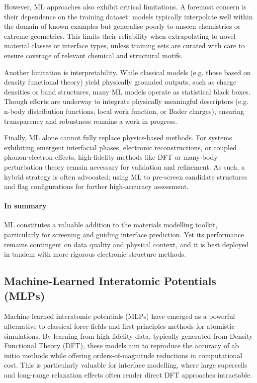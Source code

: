 However, ML approaches also exhibit critical limitations. A foremost concern is their dependence on the training dataset: models typically interpolate well within the domain of known examples but generalise poorly to unseen chemistries or extreme geometries. This limits their reliability when extrapolating to novel material classes or interface types, unless training sets are curated with care to ensure coverage of relevant chemical and structural motifs.

Another limitation is interpretability. While classical models (e.g. those based on density functional theory) yield physically grounded outputs, such as charge densities or band structures, many ML models operate as statistical black boxes. Though efforts are underway to integrate physically meaningful descriptors (e.g. n-body distribution functions, local work function, or Bader charges), ensuring transparency and robustness remains a work in progress.

Finally, ML alone cannot fully replace physics-based methods. For systems exhibiting emergent interfacial phases, electronic reconstructions, or coupled phonon-electron effects, high-fidelity methods like DFT or many-body perturbation theory remain necessary for validation and refinement. As such, a hybrid strategy is often advocated; using ML to pre-screen candidate structures and flag configurations for further high-accuracy assessment.

\paragraph{In summary} ML constitutes a valuable addition to the materials modelling toolkit, particularly for screening and guiding interface prediction. Yet its performance remains contingent on data quality and physical context, and it is best deployed in tandem with more rigorous electronic structure methods.

\subsection{Machine-Learned Interatomic Potentials (MLPs)}

Machine-learned interatomic potentials (MLPs) have emerged as a powerful alternative to classical force fields and first-principles methods for atomistic simulations. By learning from high-fidelity data, typically generated from Density Functional Theory (DFT), these models aim to reproduce the accuracy of ab initio methods while offering orders-of-magnitude reductions in computational cost. This is particularly valuable for interface modelling, where large supercells and long-range relaxation effects often render direct DFT approaches intractable.

